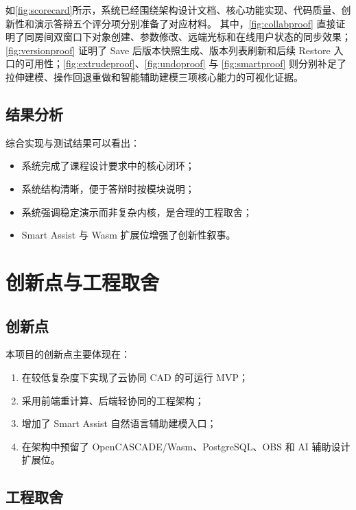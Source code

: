 \documentclass[supercite,macfont]{HustGSClassPaper}
\begin{document}
如\autoref{fig:scorecard}所示，系统已经围绕架构设计文档、核心功能实现、代码质量、创新性和演示答辩五个评分项分别准备了对应材料。
其中，\autoref{fig:collabproof} 直接证明了同房间双窗口下对象创建、参数修改、远端光标和在线用户状态的同步效果；\autoref{fig:versionproof} 证明了 Save 后版本快照生成、版本列表刷新和后续 Restore 入口的可用性；\autoref{fig:extrudeproof}、\autoref{fig:undoproof} 与 \autoref{fig:smartproof} 则分别补足了拉伸建模、操作回退重做和智能辅助建模三项核心能力的可视化证据。

\subsection{结果分析}

综合实现与测试结果可以看出：

\begin{itemize}[leftmargin=2em]
  \item 系统完成了课程设计要求中的核心闭环；
  \item 系统结构清晰，便于答辩时按模块说明；
  \item 系统强调稳定演示而非复杂内核，是合理的工程取舍；
  \item Smart Assist 与 Wasm 扩展位增强了创新性叙事。
\end{itemize}

\section{创新点与工程取舍}

\subsection{创新点}

本项目的创新点主要体现在：

\begin{enumerate}[leftmargin=2em]
  \item 在较低复杂度下实现了云协同 CAD 的可运行 MVP；
  \item 采用前端重计算、后端轻协同的工程架构；
  \item 增加了 Smart Assist 自然语言辅助建模入口；
  \item 在架构中预留了 OpenCASCADE/Wasm、PostgreSQL、OBS 和 AI 辅助设计扩展位。
\end{enumerate}

\subsection{工程取舍}
\end{document}
